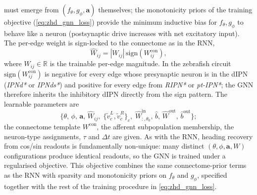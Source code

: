 \documentclass[11pt]{article}
\def\R{\mathbb{R}}
\begin{document}
must emerge from $(f_\theta, g_\phi, \mathbf a)$ themselves; the
monotonicity priors of the training objective (\cref{eq:zhd_gnn_loss})
provide the minimum inductive bias for $f_\theta, g_\phi$ to behave like a
neuron (postsynaptic drive increases with net excitatory input). The per-edge weight is
sign-locked to the connectome as in the RNN,
\begin{equation}
\hat W_{ij}
  = |W_{ij}|\,\mathrm{sign}(W^{\mathrm{con}}_{ij}),
\label{eq:zhd_gnn_w}
\end{equation}
where $W_{ij} \in \R$ is the trainable per-edge magnitude.
In the zebrafish circuit $\mathrm{sign}(W^{\mathrm{con}}_{ij})$ is
negative for every edge whose presynaptic neuron is in the dIPN
(\emph{IPNd*} or \emph{IPNds*}) and positive for every edge from
\emph{RIPN*} or \emph{pt-IPN*}; the GNN therefore inherits the
inhibitory dIPN directly from the sign pattern. The learnable parameters are
\begin{equation*}
\big\{\theta,\,\phi,\,\mathbf a,\,\hat{W}_{ij},\;
\{\tilde v_c^{L},\tilde v_c^{R}\}_c,\;
\hat W^{\mathrm{in}}_{:,\theta_0},\,\hat b,\,
\hat W^{\mathrm{out}},\,\hat b^{\mathrm{out}}\big\};
\end{equation*}
the connectome template $W^{\mathrm{con}}$, the afferent
subpopulation membership, the neuron-type assignments, $\tau$ and
$\Delta t$ are given. As with the RNN, heading recovery from cos/sin readouts is
fundamentally non-unique: many distinct $(\theta,\phi,\mathbf a,W)$
configurations produce identical readouts, so the GNN is trained under a
regularised objective. This objective combines the same connectome-prior terms as the RNN with
sparsity and monotonicity priors on $f_\theta$ and $g_\phi$, specified
together with the rest of the training procedure in \cref{eq:zhd_gnn_loss}.
\end{document}
